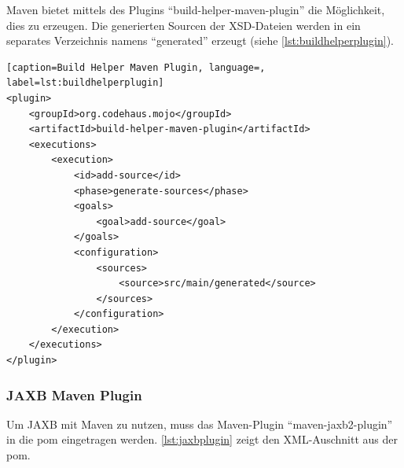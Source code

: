 \gls{Maven} bietet mittels des Plugins \enquote{build-helper-maven-plugin} die Möglichkeit, dies zu erzeugen. 
Die generierten Sourcen der XSD-Dateien werden in ein separates Verzeichnis namens \enquote{generated} erzeugt (siehe \autoref{lst:buildhelperplugin}). 

\begin{lstlisting}[caption=Build Helper Maven Plugin, language=, label=lst:buildhelperplugin]
<plugin>
    <groupId>org.codehaus.mojo</groupId>
    <artifactId>build-helper-maven-plugin</artifactId>
    <executions>
        <execution>
            <id>add-source</id>
            <phase>generate-sources</phase>
            <goals>
                <goal>add-source</goal>
            </goals>
            <configuration>
                <sources>
                    <source>src/main/generated</source>
                </sources>
            </configuration>
        </execution>
    </executions>
</plugin>
\end{lstlisting}

\subsubsection{JAXB Maven Plugin}

Um JAXB mit \gls{Maven} zu nutzen, muss das \gls{Maven}-Plugin \enquote{maven-jaxb2-plugin} in die \gls{pom} eingetragen werden. \autoref{lst:jaxbplugin} zeigt den XML-Auschnitt aus der \gls{pom}. 


